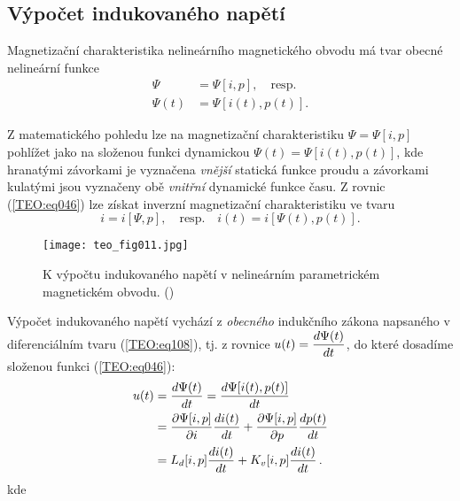     \subsection{Výpočet indukovaného napětí}
      Magnetizační charakteristika nelineárního magnetického obvodu má tvar obecné nelineární funkce
      \begin{align}\label{TEO:eq046}
        \Psi    &= \Psi[i,p], \quad\text{resp.}   \nonumber \\
        \Psi(t) &= \Psi[i(t), p(t)].
      \end{align}
    
      Z matematického pohledu lze na magnetizační charakteristiku \(\Psi = \Psi[i,p]\) pohlížet 
      jako na složenou funkci dynamickou \(\Psi(t) = \Psi[i(t),p(t)]\), kde hranatými závorkami je 
      vyznačena \emph{vnější} statická funkce proudu a závorkami kulatými jsou vyznačeny obě 
      \emph{vnitřní} dynamické funkce času. Z rovnic (\ref{TEO:eq046}) lze získat inverzní 
      magnetizační charakteristiku ve tvaru
      \begin{equation}\label{TEO:eq047}
        i = i[\Psi, p], \quad\text{resp.}\quad i(t) = i[\Psi(t), p(t)].
      \end{equation}

      \begin{figure}[ht!]  %
        \centering
        \texttt{[image: teo\_fig011.jpg]}
        \caption{K výpočtu indukovaného napětí v nelineárním parametrickém magnetickém obvodu. 
                (\cite[s.~161]{Patocka4})}
        \label{teo:fig011}
      \end{figure}
      
      Výpočet indukovaného napětí vychází z \emph{obecného} indukčního zákona napsaného v 
      diferenciálním tvaru (\ref{TEO:eq108}), tj. z rovnice \(u(t) = \dfrac{d \Psi(t)}{d t}\), do 
      které dosadíme složenou funkci (\ref{TEO:eq046}):
      \begin{align}
        u(t) &= \dfrac{d \Psi(t)}{d t} = \dfrac{d \Psi[i(t),p(t)]}{d t}                   \nonumber \\
             &= \dfrac{\partial \Psi[i, p]}{\partial i}\dfrac{d i(t)}{d t} 
              + \dfrac{\partial \Psi[i, p]}{\partial p}\dfrac{d p(t)}{d t}                             \nonumber \\
             &= L_d[i,p]\dfrac{d i(t)}{d t} 
              + K_v[i,p]\dfrac{d i(t)}{d t}\,.                                      \label{TEO:eq048}
      \end{align}
      kde 
           
